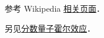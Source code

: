 
\begin{issues}
\issueDraft
\end{issues}

参考 Wikipedia \href{https://en.wikipedia.org/wiki/Quantum_Hall_effect}{相关页面}．

另见\href{https://en.wikipedia.org/wiki/Fractional_quantum_Hall_effect}{分数量子霍尔效应}．
